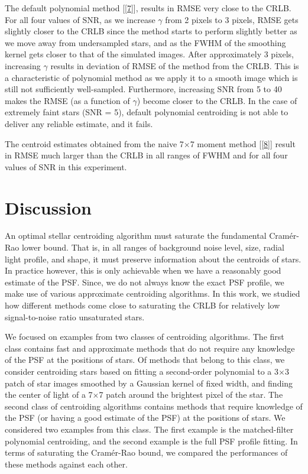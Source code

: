 \documentclass[12pt, preprint]{aastex}
\begin{document}
The default polynomial method [\ref{7}], results in RMSE very close to the CRLB.
For all four values of SNR, as we increase $\gamma$ from 2 pixels to 3 pixels,
RMSE gets slightly closer to the CRLB since the method starts to perform
slightly better as we move away from undersampled stars, and as the FWHM of the smoothing kernel
gets closer to that of the simulated images.
After approximately 3 pixels, increasing $\gamma$ results in deviation of RMSE of the method from the CRLB.
This is a characteristic of polynomial method as we apply it to a smooth image which is still not sufficiently
well-sampled.  Furthermore, increasing SNR from 5 to 40 makes the RMSE (as a function of $\gamma$) become
closer to the CRLB. In the case of extremely faint stars (SNR = 5),
default polynomial centroiding is not able to deliver any reliable estimate, and it fails.

The centroid estimates obtained from the naive 7$\times$7 moment method [\ref{8}]
result in RMSE much larger than the CRLB in all ranges of FWHM and for all four
values of SNR in this experiment. 

\section{Discussion}\label{sec:discussion}

An optimal stellar centroiding algorithm must saturate the fundamental Cram\'{e}r-Rao lower 
bound. That is, in all ranges of background noise level, size, radial light profile,
and shape, it must preserve information about the centroids of stars. In practice however,
this is only achievable when we have a reasonably good estimate of the PSF. Since, we do not always 
know the exact PSF profile, we make use of various approximate centroiding algorithms. In this work, we
studied how different methods come close to saturating the CRLB for relatively low signal-to-noise ratio
unsaturated stars.
 
We focused on examples from two classes of centroiding algorithms. The first class contains fast and approximate
methods that do not require any knowledge of the PSF at the positions of stars. Of methods that belong to this class,
we consider centroiding stars based on fitting a second-order
polynomial to a 3$\times$3 patch of star images smoothed by a Gaussian kernel of fixed width, and finding the center of light 
of a 7$\times$7 patch around the brightest pixel of the star.
The second class of centroiding algorithms contains methods that require knowledge of the PSF (or having a good estimate
of the PSF) at the positions of stars. We considered two examples from this class. The first example
is the matched-filter polynomial centroiding, and the
second example is the full PSF profile fitting. In terms of saturating the Cram\'{e}r-Rao bound, we compared 
the performances of these methods against each other.
\end{document}
